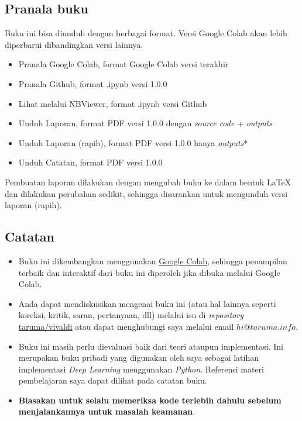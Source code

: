 \documentclass[11pt]{article}
\providecommand{\tightlist}{%
      \setlength{\itemsep}{0pt}\setlength{\parskip}{0pt}}
\begin{document}
\hypertarget{pranala-buku}{%
\subsection{Pranala buku}\label{pranala-buku}}

Buku ini bisa diunduh dengan berbagai format. Versi Google Colab akan
lebih diperbarui dibandingkan versi lainnya.

\begin{itemize}
\tightlist
\item
  Pranala Google Colab, format Google Colab versi terakhir
\item
  Pranala Github, format .ipynb versi 1.0.0
\item
  Lihat melalui NBViewer, format .ipynb versi Github
\item
  Unduh Laporan, format PDF versi 1.0.0 dengan \emph{source code} +
  \emph{outputs}
\item
  Unduh Laporan (rapih), format PDF versi 1.0.0 hanya \emph{outputs}*
\item
  Unduh Catatan, format PDF versi 1.0.0
\end{itemize}

Pembuatan laporan dilakukan dengan mengubah buku ke dalam bentuk LaTeX
dan dilakukan perubahan sedikit, sehingga disarankan untuk mengunduh
versi laporan (rapih).

\hypertarget{catatan}{%
\subsection{Catatan}\label{catatan}}

\begin{itemize}
\tightlist
\item
  Buku ini dikembangkan menggunakan
  \href{https://colab.research.google.com/}{Google Colab}, sehingga
  penampilan terbaik dan interaktif dari buku ini diperoleh jika dibuka
  melalui Google Colab.
\item
  Anda dapat mendiskusikan mengenai buku ini (atau hal lainnya seperti
  koreksi, kritik, saran, pertanyaan, dll) melalui isu di
  \emph{repository}
  \href{https://github.com/taruma/vivaldi}{taruma/vivaldi} atau dapat
  menghubungi saya melalui email \(hi@taruma.info\).
\item
  Buku ini masih perlu dievaluasi baik dari teori ataupun implementasi.
  Ini merupakan buku pribadi yang digunakan oleh saya sebagai latihan
  implementasi \emph{Deep Learning} menggunakan \emph{Python}. Referensi
  materi pembelajaran saya dapat dilihat pada catatan buku.
\item
  \textbf{Biasakan untuk selalu memeriksa kode terlebih dahulu sebelum
  menjalankannya untuk masalah keamanan}.
\end{itemize}
\end{document}
